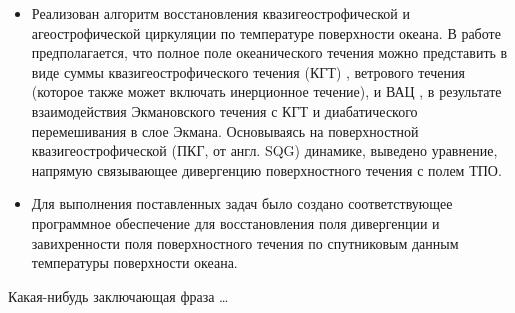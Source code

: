 \begin{itemize}
\item Реализован алгоритм восстановления квазигеострофической и агеострофической циркуляции по температуре поверхности океана. В работе предполагается, что полное поле океанического течения можно представить в виде суммы квазигеострофического течения (КГТ) , ветрового течения  (которое также может включать инерционное течение), и ВАЦ , в результате взаимодействия Экмановского течения с КГТ и диабатического перемешивания в слое Экмана. Основываясь на поверхностной квазигеострофической (ПКГ, от англ. SQG) динамике, выведено уравнение, напрямую связывающее дивергенцию поверхностного течения с полем ТПО.

\item Для выполнения поставленных задач было создано соответствующее программное обеспечение для восстановления поля дивергенции и завихренности поля поверхностного течения по спутниковым данным температуры поверхности океана.

\end{itemize}

Какая-нибудь заключающая фраза \ldots

\clearpage